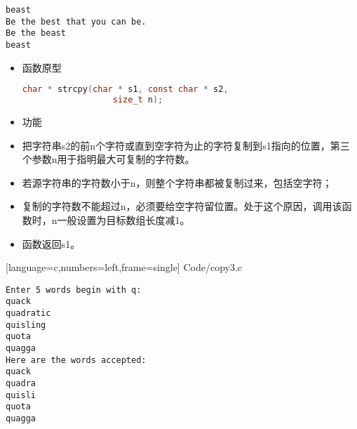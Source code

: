 \begin{frame}[fragile]
\begin{lstlisting}[backgroundcolor=\color{blue!20}]
beast
Be the best that you can be.
Be the beast
beast
\end{lstlisting}

\end{frame}

\begin{frame}[fragile] 
\begin{itemize}
\item \textcolor{acolor1}{函数原型}
  \begin{lstlisting}[language=c,backgroundcolor=\color{red!20}]
    char * strcpy(char * s1, const char * s2,
                  size_t n);
\end{lstlisting}
\item 
  \textcolor{acolor1}{功能}
\item[]
  把字符串{\tf s2}的前{\tf n}个字符或直到空字符为止的字符复制到{\tf s1}指向的位置，第三个参数{\tf n}用于指明最大可复制的字符数。
\end{itemize}
\end{frame}

\begin{frame}[fragile] 
\begin{itemize}
\item 
若源字符串的字符数小于{\tf n}，则整个字符串都被复制过来，包括空字符；
\item
复制的字符数不能超过{\tf n}，必须要给空字符留位置。处于这个原因，调用该函数时，{\tf n}一般设置为目标数组长度减1。
\item
函数返回{\tf s1}。
\end{itemize}
\end{frame}


\begin{frame}

[language=c,numbers=left,frame=single]
{Code/copy3.c}
\end{frame}


\begin{frame}[fragile]
\begin{lstlisting}[backgroundcolor=\color{blue!20}]
Enter 5 words begin with q:
quack
quadratic
quisling
quota
quagga
Here are the words accepted:
quack
quadra
quisli
quota
quagga
\end{lstlisting}
\end{frame}



